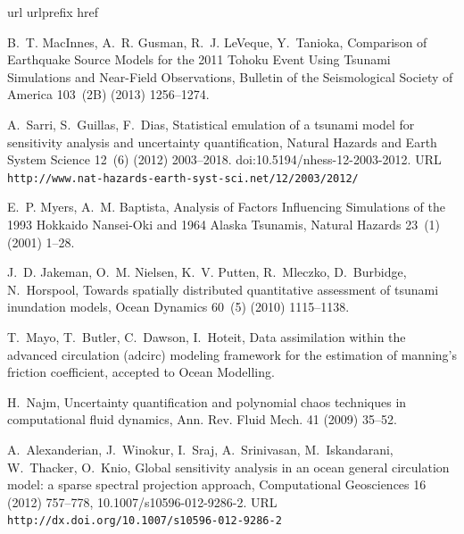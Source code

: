 \documentclass[review,12pt]{elsarticle}
\begin{document}

\begin{thebibliography}{10}
\expandafter\ifx\csname url\endcsname\relax
  \def\url#1{\texttt{#1}}\fi
\expandafter\ifx\csname urlprefix\endcsname\relax\def\urlprefix{URL }\fi
\expandafter\ifx\csname href\endcsname\relax
  \def\href#1#2{#2} \def\path#1{#1}\fi

B.~T. MacInnes, A.~R. Gusman, R.~J. LeVeque, Y.~Tanioka, {Comparison of
  Earthquake Source Models for the 2011 Tohoku Event Using Tsunami Simulations
  and Near-Field Observations}, Bulletin of the Seismological Society of
  America 103~(2B) (2013) 1256--1274.

A.~Sarri, S.~Guillas, F.~Dias,
  \href{http://www.nat-hazards-earth-syst-sci.net/12/2003/2012/}{Statistical
  emulation of a tsunami model for sensitivity analysis and uncertainty
  quantification}, Natural Hazards and Earth System Science 12~(6) (2012)
  2003--2018.
\newblock \href {http://dx.doi.org/10.5194/nhess-12-2003-2012}
  {\path{doi:10.5194/nhess-12-2003-2012}}.
\newline\urlprefix\url{http://www.nat-hazards-earth-syst-sci.net/12/2003/2012/}

E.~P. Myers, A.~M. Baptista, {Analysis of Factors Influencing Simulations of
  the 1993 Hokkaido Nansei-Oki and 1964 Alaska Tsunamis}, Natural Hazards
  23~(1) (2001) 1--28.

J.~D. Jakeman, O.~M. Nielsen, K.~V. Putten, R.~Mleczko, D.~Burbidge,
  N.~Horspool, {Towards spatially distributed quantitative assessment of
  tsunami inundation models}, Ocean Dynamics 60~(5) (2010) 1115--1138.

T.~Mayo, T.~Butler, C.~Dawson, I.~Hoteit, Data assimilation within the advanced
  circulation (adcirc) modeling framework for the estimation of manning’s
  friction coefficient, accepted to Ocean Modelling.

H.~Najm, Uncertainty quantification and polynomial chaos techniques in
  computational fluid dynamics, Ann. Rev. Fluid Mech. 41 (2009) 35--52.

A.~Alexanderian, J.~Winokur, I.~Sraj, A.~Srinivasan, M.~Iskandarani,
  W.~Thacker, O.~Knio,
  \href{http://dx.doi.org/10.1007/s10596-012-9286-2}{Global sensitivity
  analysis in an ocean general circulation model: a sparse spectral projection
  approach}, Computational Geosciences 16 (2012) 757--778,
  10.1007/s10596-012-9286-2.
\newline\urlprefix\url{http://dx.doi.org/10.1007/s10596-012-9286-2}


\end{thebibliography}
\end{document}

